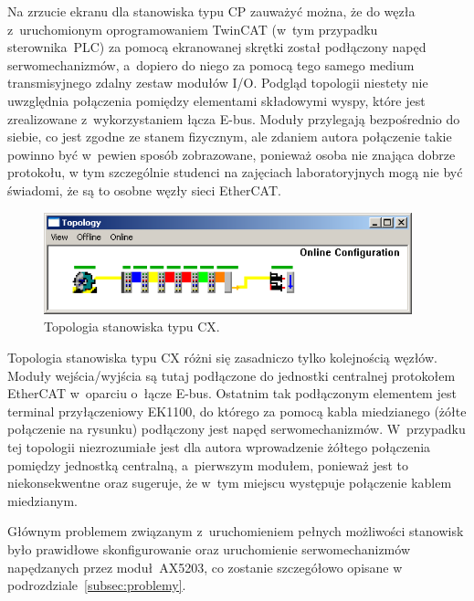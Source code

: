 Na zrzucie ekranu dla stanowiska typu CP zauważyć można, że do węzła z~uruchomionym oprogramowaniem TwinCAT (w~tym przypadku sterownika~PLC) za pomocą ekranowanej skrętki został podłączony napęd serwomechanizmów, a~dopiero do niego za pomocą tego samego medium transmisyjnego zdalny zestaw modułów I/O. Podgląd topologii niestety nie uwzględnia połączenia pomiędzy elementami składowymi wyspy, które jest zrealizowane z~wykorzystaniem łącza E-bus. Moduły przylegają bezpośrednio do siebie, co jest zgodne ze stanem fizycznym, ale zdaniem autora połączenie takie powinno być w~pewien sposób zobrazowane, ponieważ osoba nie znająca dobrze protokołu, w tym szczególnie studenci na zajęciach laboratoryjnych mogą nie być świadomi, że są to osobne węzły sieci EtherCAT.
\clearpage
\begin{figure}[!htb] 	\centering 	\includegraphics[width=0.95\textwidth]{images/topologyCX} \caption{Topologia stanowiska typu CX.} \label{topology:cx} \end{figure}

Topologia stanowiska typu CX różni się zasadniczo tylko kolejnością węzłów. Moduły wejścia/wyjścia są tutaj podłączone do jednostki centralnej protokołem EtherCAT w~oparciu o~łącze E-bus. Ostatnim tak podłączonym elementem jest terminal przyłączeniowy EK1100, do którego za pomocą kabla miedzianego (żółte połączenie na rysunku) podłączony jest napęd serwomechanizmów. W~przypadku tej topologii niezrozumiałe jest dla autora wprowadzenie żółtego połączenia pomiędzy jednostką centralną, a~pierwszym modułem, ponieważ jest to niekonsekwentne oraz sugeruje, że w~tym miejscu występuje połączenie kablem miedzianym.

Głównym problemem związanym z~uruchomieniem pełnych możliwości stanowisk było prawidłowe skonfigurowanie oraz uruchomienie serwomechanizmów napędzanych przez moduł~AX5203, co zostanie szczegółowo opisane w podrozdziale~\ref{subsec:problemy}.

